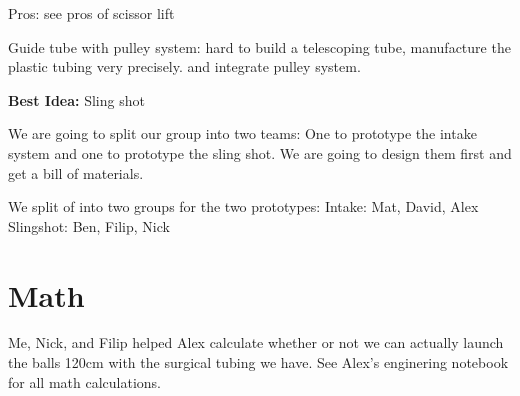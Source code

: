 Pros: see pros of scissor lift

\textbf{}{Guide tube with pulley system:}
hard to build a telescoping tube, manufacture the plastic tubing very precisely. and integrate pulley system.

\textbf{Best Idea:}
 Sling shot

We are going to split our group into two teams: One to prototype the intake system and one to prototype the sling shot. We are going to design them first and get a bill of materials. 

We split of into two groups for the two prototypes: 
Intake: Mat, David, Alex
Slingshot: Ben, Filip, Nick 

\section*{Math}
Me, Nick, and Filip helped Alex calculate whether or not we can actually launch the balls 120cm with the surgical tubing we have. See Alex's enginering notebook for all math calculations. 